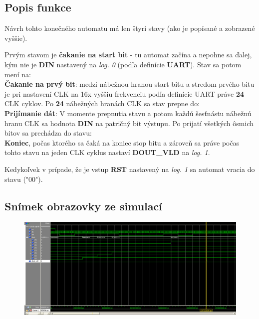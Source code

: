 \documentclass{article}
\begin{document}
\subsection*{Popis funkce}
\bigskip
Návrh tohto konečného automatu má len štyri stavy (ako je popísané a zobrazené
vyššie).
\par
Prvým stavom je \textbf{čakanie na start bit} - tu automat začína a nepohne sa 
ďalej, kým nie je \textbf{DIN} nastavený na \emph{log. 0} 
(podľa definície \textbf{UART}). Stav sa potom mení na: \\
\textbf{Čakanie na prvý bit}: medzi nábežnou hranou start bitu a stredom 
prvého bitu je pri nastavení CLK na 16x vyššiu frekvenciu podľa definície UART 
práve \textbf{24} CLK cyklov. Po \textbf{24} nábežných hranách CLK sa stav 
prepne do: \\
\textbf{Prijímanie dát}: V momente prepnutia stavu a potom každú šesťnástu 
nábežnú hranu CLK sa hodnota \textbf{DIN}  na patričný bit 
výstupu. Po prijatí všetkých ôsmich bitov sa prechádza do stavu: \\
\textbf{Koniec}, počas ktorého sa čaká na koniec stop bitu a zároveň sa práve
počas tohto stavu na jeden CLK cyklus nastaví \textbf{DOUT\_VLD} na \emph{log. 1}.
\par
Kedykoľvek v prípade, že je vstup \textbf{RST} nastavený na \emph{log. 1} sa
automat vracia do stavu  ("00").

\newpage


\begin{landscape}
\section*{Snímek obrazovky ze simulací}
\bigskip

\begin{figure}[h]
  \begin{center}
    \includegraphics[width=24cm]{src/sim_screenshot.eps}
  \end{center}
\end{figure}
\end{landscape}
\end{document}
